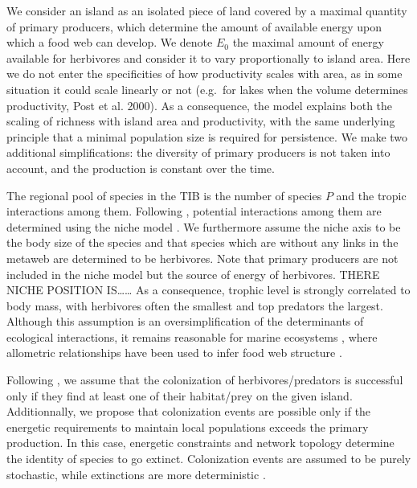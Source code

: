 We consider an island as an isolated piece of land covered by a maximal
quantity of primary producers, which determine the amount of available
energy upon which a food web can develop. We denote \(E_0\) the maximal
amount of energy available for herbivores and consider it to vary
proportionally to island area. Here we do not enter the specificities of
how productivity scales with area, as in some situation it could scale
linearly or not (e.g.~for lakes when the volume determines productivity,
Post et al. 2000). As a consequence, the model explains both the scaling
of richness with island area and productivity, with the same underlying
principle that a minimal population size is required for persistence. We
make two additional simplifications: the diversity of primary producers
is not taken into account, and the production is constant over the time.

The regional pool of species in the TIB is the number of species \(P\)
and the tropic interactions among them. Following \citet{Cazelles2016a}
, potential interactions among them are determined using the niche model
\citep{Williams2000}. We furthermore assume the niche axis to be the
body size of the species \citep{Gravel2013} and that species which are
without any links in the metaweb are determined to be herbivores. Note
that primary producers are not included in the niche model but the
source of energy of herbivores. THERE NICHE POSITION IS\ldots{}\ldots{}
As a consequence, trophic level is strongly correlated to body mass,
with herbivores often the smallest and top predators the largest.
Although this assumption is an oversimplification of the determinants of
ecological interactions, it remains reasonable for marine ecosystems
\citep{Trebilco2013}, where allometric relationships have been used to
infer food web structure \citep{Gravel2013}.

Following \citet{Gravel2011}, we assume that the colonization of
herbivores/predators is successful only if they find at least one of
their habitat/prey on the given island. Additionnally, we propose that
colonization events are possible only if the energetic requirements to
maintain local populations exceeds the primary production. In this case,
energetic constraints and network topology determine the identity of
species to go extinct. Colonization events are assumed to be purely
stochastic, while extinctions are more deterministic \citep[this
difference in stochastic nature between these fundamental processes of
biogeography has been recently supported in][]{Cirtwill2015}.

